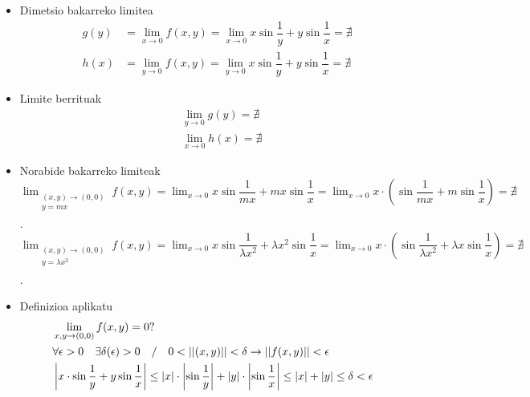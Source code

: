 \begin{itemize}
    \item Dimetsio bakarreko limitea
    \begin{eqnarray*}
        &g(y)&=\lim_{x \to 0}f(x,y)=\lim_{x \to 0} x\sin \dfrac{1}{y} +y \sin \dfrac{1}{x}= \nexists\\
        &h(x)&=\lim_{y \to 0}f(x,y)=\lim_{y \to 0} x\sin \dfrac{1}{y} +y \sin \dfrac{1}{x}= \nexists
    \end{eqnarray*}
    
    \item Limite berrituak
    \begin{eqnarray*}
        &&\lim_{y \to 0}g(y)=\nexists\\
        &&\lim_{x \to 0}h(x)=\nexists
    \end{eqnarray*}
    
    \item Norabide bakarreko limiteak \newline
    \newline
    $\displaystyle{ \lim_{ \begin{array}{c} \scriptstyle (x,y) \rightarrow (0,0) \\ \scriptstyle y=mx \\ \end{array} } f(x,y)= \lim_{x \rightarrow 0} x\sin \dfrac{1}{mx} +mx \sin \dfrac{1}{x}=\lim_{x \rightarrow 0} x\cdot\left(\sin \dfrac{1}{mx} +m \sin \dfrac{1}{x}\right)=\nexists } $.
    \newline
    $\displaystyle{ \lim_{ \begin{array}{c} \scriptstyle (x,y) \rightarrow (0,0) \\ \scriptstyle y=\lambda x^2 \\ \end{array} }f(x,y)= \lim_{x \rightarrow 0} x\sin \dfrac{1}{\lambda x^2} +\lambda x^2 \sin \dfrac{1}{x}=\lim_{x \rightarrow 0} x\cdot\left(\sin \dfrac{1}{\lambda x^2} +\lambda x \sin \dfrac{1}{x}\right)=\nexists } $.
    \newpage
    \item Definizioa aplikatu
    \begin{align*}
    &\lim_{x,y \to (0,0)}f(x,y)=0?\\
    &\forall \epsilon >0 \quad \exists \delta(\epsilon)>0 \quad / \quad0<||(x,y)||<\delta \rightarrow ||f(x,y)||<\epsilon  \\
    &\left|x\cdot \sin \frac{1}{y}+ y \sin \frac{1}{x}\right|\leq\left| x\right|\cdot\left |\sin\frac{1}{y}\right |+\left|y\right|\cdot\left|\sin\frac{1}{x}\right|\leq \abs{x}+\abs{y}\leq \delta < \epsilon\\
    \end{align*}
\end{itemize}

